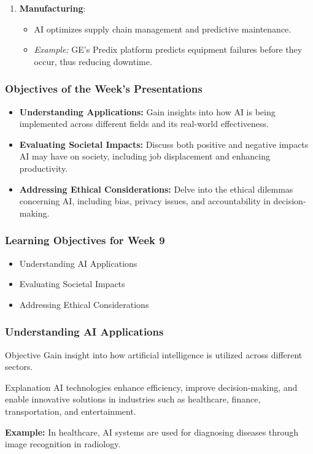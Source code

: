 \documentclass[aspectratio=169]{beamer}
\begin{document}
\begin{frame}[fragile]
\begin{enumerate}
        \item \textbf{Manufacturing}:
            \begin{itemize}
                \item AI optimizes supply chain management and predictive maintenance.
                \item \textit{Example:} GE’s Predix platform predicts equipment failures before they occur, thus reducing downtime.
            \end{itemize}
    \end{enumerate}
\end{frame}

\begin{frame}[fragile]
    \frametitle{Objectives of the Week's Presentations}
    \begin{itemize}
        \item \textbf{Understanding Applications:} 
            Gain insights into how AI is being implemented across different fields and its real-world effectiveness.

        \item \textbf{Evaluating Societal Impacts:}
            Discuss both positive and negative impacts AI may have on society, including job displacement and enhancing productivity.

        \item \textbf{Addressing Ethical Considerations:}
            Delve into the ethical dilemmas concerning AI, including bias, privacy issues, and accountability in decision-making.
    \end{itemize}
\end{frame}

\begin{frame}[fragile]
    \frametitle{Learning Objectives for Week 9}
    \begin{itemize}
        \item Understanding AI Applications
        \item Evaluating Societal Impacts
        \item Addressing Ethical Considerations
    \end{itemize}
\end{frame}

\begin{frame}[fragile]
    \frametitle{Understanding AI Applications}
    \begin{block}{Objective}
        Gain insight into how artificial intelligence is utilized across different sectors.
    \end{block}
    \begin{block}{Explanation}
        AI technologies enhance efficiency, improve decision-making, and enable innovative solutions in industries such as healthcare, finance, transportation, and entertainment.
    \end{block}
    \begin{example}
        \textbf{Example:} In healthcare, AI systems are used for diagnosing diseases through image recognition in radiology.
    \end{example}
\end{frame}
\end{document}
